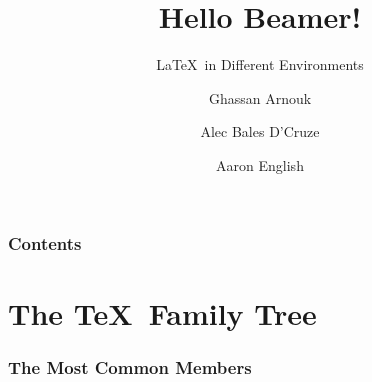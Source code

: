 \documentclass{beamer}
\title{Hello Beamer!}
\subtitle{\LaTeX~in Different Environments}
\author{Ghassan Arnouk \and
            Alec Bales D'Cruze \and
            Aaron English}
\begin{document}
    \begin{frame}
        \titlepage
    \end{frame}
    \begin{frame}
        \frametitle{Contents}
        \tableofcontents
    \end{frame}
    \section{The \TeX~Family Tree}
        \begin{frame}
            \frametitle{The Most Common Members}
            
        \end{frame}
        \begin{frame}
            \frametitle{}
        \end{frame}
        \begin{frame}
            \frametitle{}
        \end{frame}
        \begin{frame}
            \frametitle{}
        \end{frame}
        \begin{frame}
            \frametitle{}
        \end{frame}
        \begin{frame}
            \frametitle{}
        \end{frame}
\end{document}
